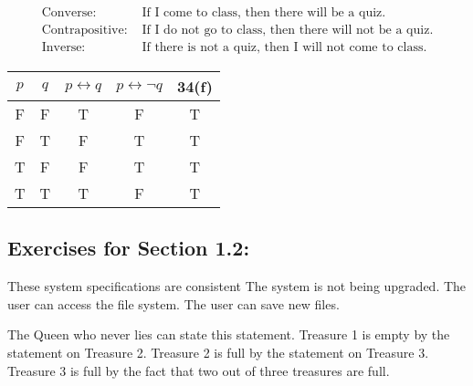 \documentclass[12pt]{article}  %
\newcommand{\NOT}{\neg}
\newcommand{\IFF}{\leftrightarrow}
\begin{document}
                                   \newline
{}

\begin{align*}
    \textrm{Converse: } & \textrm{If I come to class, then there will be a quiz.} \\
    \textrm{Contrapositive: } & \textrm{If I do not go to class, then there will not be a quiz.} \\
    \textrm{Inverse: } & \textrm{If there is not a quiz, then I will not come to class.}
\end{align*}


\begin{tabular}{|c|c|c|c|c|}  %
\hline                  %
$p$ & $q$ & $p\IFF q$ & $p\IFF\NOT q$ & 34(f)\\       %
\hline
F & F & T & F & T\\
\hline
F & T & F & T & T\\
\hline
T & F & F & T & T\\
\hline
T & T & T & F & T\\
\hline
\end{tabular}
\clearpage


\subsection*{Exercises for Section 1.2:}     

\newline
These system specifications are consistent\newline
The system is not being upgraded.\newline
The user can access the file system.\newline
The user can save new files.\newline

\newline
The Queen who never lies can state this statement.\newline
Treasure 1 is empty by the statement on Treasure 2.\newline
Treasure 2 is full by the statement on Treasure 3.\newline
Treasure 3 is full by the fact that two out of three treasures are full.
\end{document}

